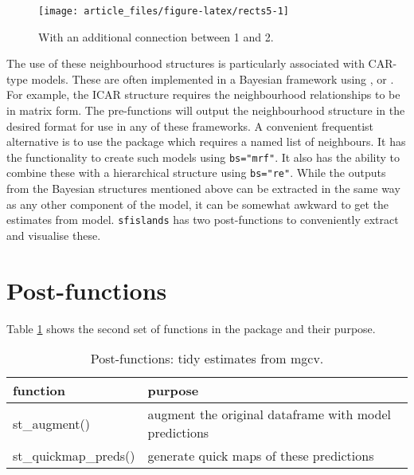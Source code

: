 \begin{figure}

{\centering \texttt{[image: article\_files/figure-latex/rects5-1]} 

}

\caption{With an additional connection between 1 and 2. }\label{fig:rects5}
\end{figure}

The use of these neighbourhood structures is particularly associated with CAR-type models.
These are often implemented in a Bayesian framework using
,  or . For example, the  ICAR structure requires the neighbourhood relationships to be in matrix form. The pre-functions will output the
neighbourhood structure in the desired format for use in any of these
frameworks. A convenient frequentist alternative is to use the
 package which requires a named list of neighbours. It has the functionality to create such models
using \texttt{bs="mrf"}. It also has the ability to combine these with a
hierarchical structure using \texttt{bs="re"}. While the outputs from the
Bayesian structures mentioned above can be extracted in the same way as
any other component of the model, it can be somewhat awkward to get the
estimates from  model. \texttt{sfislands} has two post-functions to conveniently extract and visualise these.

\hypertarget{post-functions}{%
\section{Post-functions}\label{post-functions}}

Table \ref{tab:postfunc-latex} shows the second set of functions in the package and their purpose.

\begin{table}

\caption{\label{tab:postfunc-latex}Post-functions: tidy estimates from mgcv.}
\centering
\fontsize{9}{11}\selectfont
\begin{tabular}[t]{l|l}
\hline
\textbf{function} & \textbf{purpose}\\
\hline
st\_augment() & augment the original dataframe with model predictions\\
\hline
st\_quickmap\_preds() & generate quick maps of these predictions\\
\hline
\end{tabular}
\end{table}

